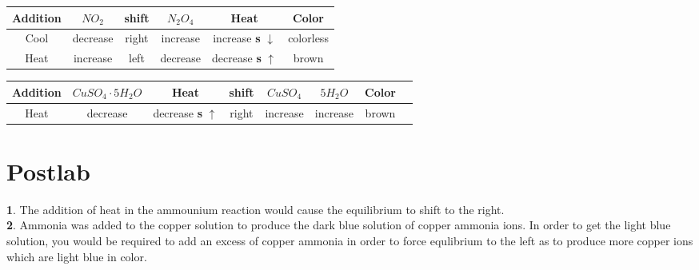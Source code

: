 \documentclass[12pt]{article}
\begin{document}
\begin{center}

  
\end{center}
\vspace{0cm} 
\begin{center}
  \begin{tabular}{|c|c|c|c|c|c|}
    \hline
    Addition&$NO_2$&shift&$N_2O_4$&Heat & Color\\
    \hline
    Cool&decrease&right&increase&increase \textbf s $\downarrow$& colorless\\
    \hline
    Heat&increase&left&decrease&decrease \textbf s $\uparrow$& brown\\
    \hline
    
  \end{tabular}
\end{center}
\vspace{0cm}
\begin{center}
\end{center}
\vspace{0cm}
\begin{center}
\begin{tabular}{|c|c|c|c|c|c|c|c|}
  \hline
  Addition& $CuSO_4 \cdot 5H_2O$ & Heat& shift & $CuSO_4$&$5H_2O$ & Color\\

  \hline

  Heat&decrease&decrease \textbf s $\uparrow$&right&increase&increase&brown\\

  \hline
  
\end{tabular}

\end{center}

\section{Postlab}


\noindent
\textbf 1. The addition of heat in the ammounium reaction would cause the equilibrium to shift to the right.\\

\noindent
\textbf 2. Ammonia was added to the copper solution to produce the dark blue solution of copper ammonia ions. In order to get the light blue solution, you would be required to add an excess of copper ammonia in order to force equlibrium to the left as to produce more copper ions which are light blue in color.\\
\end{document}
